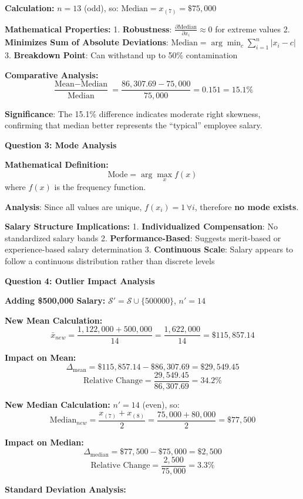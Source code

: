 \documentclass[11pt]{article}
\begin{document}
\textbf{Calculation:} \(n = 13\) (odd), so:
\(\text{Median} = x_{(7)} = \$75,000\)

\textbf{Mathematical Properties:} 1. \textbf{Robustness}:
\(\frac{\partial \text{Median}}{\partial x_i} \approx 0\) for extreme
values 2. \textbf{Minimizes Sum of Absolute Deviations}:
\(\text{Median} = \arg\min_c \sum_{i=1}^{n}|x_i - c|\) 3.
\textbf{Breakdown Point}: Can withstand up to 50\% contamination

\textbf{Comparative Analysis:}
\[\frac{\text{Mean} - \text{Median}}{\text{Median}} = \frac{86,307.69 - 75,000}{75,000} = 0.151 = 15.1\%\]

\textbf{Significance}: The 15.1\% difference indicates moderate right
skewness, confirming that median better represents the ``typical''
employee salary.

\textbf{Question 3: Mode Analysis}

\textbf{Mathematical Definition:} \[\text{Mode} = \arg\max_{x} f(x)\]
where \(f(x)\) is the frequency function.

\textbf{Analysis}: Since all values are unique,
\(f(x_i) = 1 \, \forall i\), therefore \textbf{no mode exists}.

\textbf{Salary Structure Implications:} 1. \textbf{Individualized
Compensation}: No standardized salary bands 2.
\textbf{Performance-Based}: Suggests merit-based or experience-based
salary determination 3. \textbf{Continuous Scale}: Salary appears to
follow a continuous distribution rather than discrete levels

\textbf{Question 4: Outlier Impact Analysis}

\textbf{Adding \$500,000 Salary:} $\mathcal{S}' = \mathcal{S} \cup \{500000\}$, $n' = 14$

\textbf{New Mean Calculation:}
\[\bar{x}_{new} = \frac{1,122,000 + 500,000}{14} = \frac{1,622,000}{14} = \$115,857.14\]

\textbf{Impact on Mean:}
\[\Delta_{\text{mean}} = \$115,857.14 - \$86,307.69 = \$29,549.45\]
\[\text{Relative Change} = \frac{29,549.45}{86,307.69} = 34.2\%\]

\textbf{New Median Calculation:} \(n' = 14\) (even), so:
\[\text{Median}_{new} = \frac{x_{(7)} + x_{(8)}}{2} = \frac{75,000 + 80,000}{2} = \$77,500\]

\textbf{Impact on Median:}
\[\Delta_{\text{median}} = \$77,500 - \$75,000 = \$2,500\]
\[\text{Relative Change} = \frac{2,500}{75,000} = 3.3\%\]

\textbf{Standard Deviation Analysis:}
\end{document}
